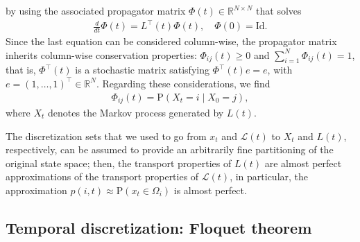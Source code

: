 \documentclass[journal=jctcce,manuscript=article]{achemso}
\newcommand{\vect}[1]{#1}
\newcommand{\ml}[0]{\mathcal {L}}
\newcommand{\id}{\mathrm{Id}}
\newcommand{\myphi}{\Phi}
\newcommand{\prob}{\textrm{P}}
\begin{document}
by using the
associated propagator matrix $\myphi(t)\in\mathbb R^{N\times N}$ that solves
\begin{align}
  \label{eq:disc-master-phi}
  \frac{d}{dt}\myphi(t) = \vect L^{\top}(t)\myphi(t), \quad \myphi(0) = \id .
\end{align}
Since the last equation can be considered column-wise, the propagator matrix inherits column-wise conservation properties:
$\Phi_{ij}(t) \ge  0$
and $\sum\limits_{i=1}^N \Phi_{ij}(t)  =  1$,
that is, $\myphi^{\top}(t)$ is a
stochastic matrix satisfying $\myphi^{\top}(t)\vect e=\vect e$,
with $\vect e=(1,\ldots,1)^{\top}\in \mathbb R^N$.
Regarding these considerations, we find
\begin{align}
\label{eq:disc-10}  
\myphi_{ij}(t)=\prob\left(\vect X_t=i\mid \vect X_0=j \right),
\end{align}
where $\vect X_t$ denotes the Markov process generated by $\vect L(t)$.
 
The discretization sets that we used to go from $\vect x_t$ and $\ml(t)$ to $\vect X_t$
and $\vect L(t)$, respectively, can be assumed to provide an arbitrarily fine
partitioning of the original state space; then, the transport properties
of $\vect L(t)$ are almost perfect approximations of the transport properties
of $\ml(t)$, in particular, the approximation $p(i,t)\approx \prob(x_t\in \Omega_i)$ is almost perfect.

\subsection{Temporal discretization: Floquet theorem}
\label{sec:floquet}
\end{document}
